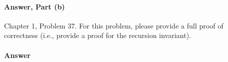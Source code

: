 \documentclass{article}
\begin{document}
\todo{}

\paragraph{Answer, Part (b)}

\todo{}

\collab{\todo{}}

Chapter 1, Problem 37.  For this problem, please provide a full proof of
correctness (i.e., provide a proof for the recursion invariant).

\paragraph{Answer}
\todo{}
\end{document}
